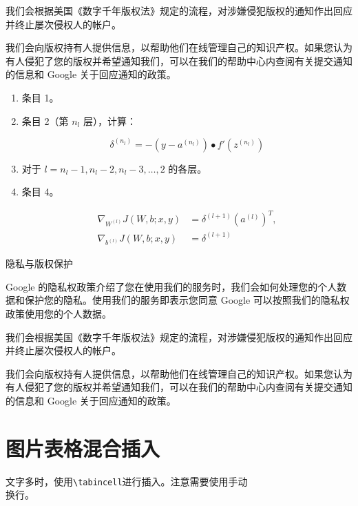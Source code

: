 我们会根据美国《数字千年版权法》规定的流程，对涉嫌侵犯版权的通知作出回应并终止屡次侵权人的帐户。

我们会向版权持有人提供信息，以帮助他们在线管理自己的知识产权。如果您认为有人侵犯了您的版权并希望通知我们，可以在我们的帮助中心内查阅有关提交通知的信息和 Google 关于回应通知的政策。

\begin{enumerate}

\item 条目 1。
\item 条目 2（第 $n_l$ 层），计算：

        $$
        \delta^{(n_l)} = - (y - a^{(n_l)}) \bullet f'(z^{(n_l)})
        $$

\item 对于 $l = n_l-1, n_l-2, n_l-3, \ldots, 2$ 的各层。
\item 条目 4。

        \[
        \begin{aligned}
        \nabla_{W^{(l)}} J(W,b;x,y) &= \delta^{(l+1)} (a^{(l)})^T, \\
        \nabla_{b^{(l)}} J(W,b;x,y) &= \delta^{(l+1)}
        \end{aligned}
        \]
\end{enumerate}

隐私与版权保护

Google 的隐私权政策介绍了您在使用我们的服务时，我们会如何处理您的个人数据和保护您的隐私。使用我们的服务即表示您同意 Google 可以按照我们的隐私权政策使用您的个人数据。

我们会根据美国《数字千年版权法》规定的流程，对涉嫌侵犯版权的通知作出回应并终止屡次侵权人的帐户。

我们会向版权持有人提供信息，以帮助他们在线管理自己的知识产权。如果您认为有人侵犯了您的版权并希望通知我们，可以在我们的帮助中心内查阅有关提交通知的信息和 Google 关于回应通知的政策。

\section{图片表格混合插入}

文字多时，使用\verb|\tabincell|进行插入。注意需要使用手动\\
换行。

